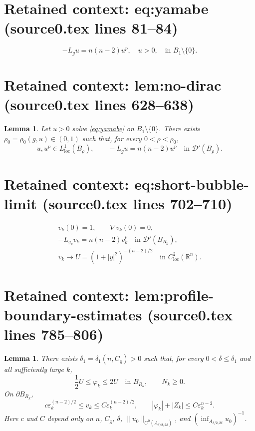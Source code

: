 \documentclass[10pt,a4paper]{amsart}
\newcommand{\R}{\mathbb R}
\theoremstyle{plain}
\newtheorem{lemma}[theorem]{Lemma}
\theoremstyle{remark}
\begin{document}
\section*{Retained context: eq:yamabe (source0.tex lines 81--84)}

\begin{equation}\label{eq:yamabe}
 -L_gu=n(n-2)u^p, \quad u>0,
 \quad\text{in }B_1\setminus\{0\}.
\end{equation}


\section*{Retained context: lem:no-dirac (source0.tex lines 628--638)}

\begin{lemma}\label{lem:no-dirac}
Let \(u>0\) solve \eqref{eq:yamabe} on \(B_1\setminus\{0\}\).
There exists \(\rho_0=\rho_0(g,u)\in(0,1)\) such that, for every
\(0<\rho<\rho_0\),
{
\[
 u,u^p\in L^1_{\mathrm{loc}}(B_\rho),\qquad
 -L_gu=n(n-2)u^p\quad\text{in }\mathcal D'(B_\rho).
\]
}
\end{lemma}


\section*{Retained context: eq:short-bubble-limit (source0.tex lines 702--710)}

\begin{equation}\label{eq:short-bubble-limit}
\begin{gathered}
 v_k(0)=1,\qquad \nabla v_k(0)=0,\\
 -L_{g_k}v_k=n(n-2)v_k^p
 \quad\text{in }\mathcal D'(B_{R_k}),\\
 v_k\to U=(1+|y|^2)^{-(n-2)/2}
 \quad\text{in }C^2_{\mathrm{loc}}(\R^n).
\end{gathered}
\end{equation}


\section*{Retained context: lem:profile-boundary-estimates (source0.tex lines 785--806)}

 \begin{lemma}\label{lem:profile-boundary-estimates}
There exists $\delta_1=\delta_1(n,C_{\mathrm g})>0$ such that, for every
$0<\delta\le\delta_1$ and all sufficiently large $k$,
{
\[
 \frac12U\le\varphi_k\le2U\quad\text{in }B_{R_k},
 \qquad N_k\ge0.
\]
}
 On $\partial B_{R_k}$,
{
\[
 c\varepsilon_k^{(n-2)/2}\le v_k\le
 C\varepsilon_k^{(n-2)/2},
 \qquad
 |\varphi_k|+|Z_k|\le C\varepsilon_k^{n-2}.
\]
}
 Here $c$ and $C$ depend only on $n$, $C_{\mathrm g}$, $\delta$,
$\|u_0\|_{C^0(A_{\delta/2,2\delta})}$, and
 $(\inf_{A_{\delta/2,2\delta}}u_0)^{-1}$.
\end{lemma}
\end{document}
